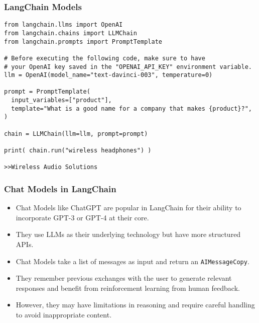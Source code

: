 \begin{frame}[fragile]\frametitle{LangChain Models}

\begin{lstlisting}
from langchain.llms import OpenAI
from langchain.chains import LLMChain
from langchain.prompts import PromptTemplate

# Before executing the following code, make sure to have
# your OpenAI key saved in the "OPENAI_API_KEY" environment variable.
llm = OpenAI(model_name="text-davinci-003", temperature=0)

prompt = PromptTemplate(
  input_variables=["product"],
  template="What is a good name for a company that makes {product}?",
)

chain = LLMChain(llm=llm, prompt=prompt)

print( chain.run("wireless headphones") )

>>Wireless Audio Solutions
\end{lstlisting}	  

\end{frame}

\begin{frame}[fragile]
\frametitle{Chat Models in LangChain}

\begin{itemize}
    \item Chat Models like ChatGPT are popular in LangChain for their ability to incorporate GPT-3 or GPT-4 at their core.
    \item They use LLMs as their underlying technology but have more structured APIs.
    \item Chat Models take a list of messages as input and return an \texttt{AIMessageCopy}.
    \item They remember previous exchanges with the user to generate relevant responses and benefit from reinforcement learning from human feedback.
    \item However, they may have limitations in reasoning and require careful handling to avoid inappropriate content.
\end{itemize}

\end{frame}


